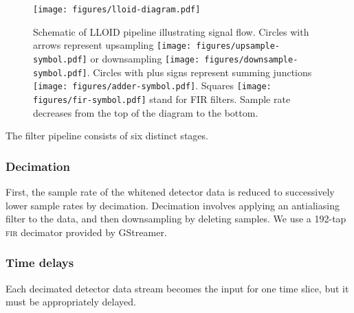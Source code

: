 \begin{figure}[htbp]
	\texttt{[image: figures/lloid-diagram.pdf]}
	\caption{Schematic of LLOID pipeline illustrating signal flow.  Circles with arrows represent upsampling \protect\texttt{[image: figures/upsample-symbol.pdf]} or downsampling \protect\texttt{[image: figures/downsample-symbol.pdf]}.  Circles with plus signs represent summing junctions \protect\texttt{[image: figures/adder-symbol.pdf]}.  Squares \protect\texttt{[image: figures/fir-symbol.pdf]} stand for FIR filters.  Sample rate decreases from the top of the diagram to the bottom.}
\end{figure}

The filter pipeline consists of six distinct stages.

\subsubsection{Decimation}

First, the sample rate of the whitened detector data is reduced to successively lower sample rates by decimation.  Decimation involves applying an antialiasing filter to the data, and then downsampling by deleting samples.  We use a 192-tap \textsc{fir} decimator provided by GStreamer.

\subsubsection{Time delays}

Each decimated detector data stream becomes the input for one time slice, but it must be appropriately delayed.

